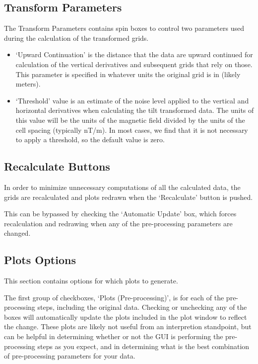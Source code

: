 \documentclass[letterpaper,10pt,english,openany,oneside]{sphinxmanual}
\begin{document}
\subsection{Transform Parameters}
\label{\detokenize{content/getting_started/GUI_overview:transform-parameters}}\label{\detokenize{content/getting_started/GUI_overview:id2}}
The Transform Parameters contains spin boxes to control two parameters used during the calculation of the transformed grids.
\begin{itemize}
\item {} 
‘Upward Continuation’ is the distance that the data are upward continued for calculation of the vertical derivatives and subsequent grids that rely on those. This parameter is specified in whatever units the original grid is in (likely meters).

\item {} 
‘Threshold’ value is an estimate of the noise level applied to the vertical and horizontal derivatives when calculating the tilt transformed data. The units of this value will be the units of the magnetic field divided by the units of the cell spacing (typically nT/m). In most cases, we find that it is not necessary to apply a threshold, so the default value is zero.

\end{itemize}


\subsection{Recalculate Buttons}
\label{\detokenize{content/getting_started/GUI_overview:recalculate-buttons}}\label{\detokenize{content/getting_started/GUI_overview:id3}}
In order to minimize unnecessary computations of all the calculated data, the grids are recalculated and plots redrawn when the ‘Recalculate’ button is pushed.

This can be bypassed by checking the ‘Automatic Update’ box, which forces recalculation and redrawing when any of the pre-processing parameters are changed.


\subsection{Plots Options}
\label{\detokenize{content/getting_started/GUI_overview:plots-options}}\label{\detokenize{content/getting_started/GUI_overview:id4}}
This section contains options for which plots to generate.

The first group of checkboxes, ‘Plots (Pre-processing)’, is for each of the pre-processing steps, including the original data. Checking or unchecking any of the boxes will automatically update the plots included in the plot window to reflect the change.
These plots are likely not useful from an interpretion standpoint, but can be helpful in determining whether or not the GUI is performing the pre-processing steps as you expect, and in determining what is the best combination of pre-processing parameters for your data.
\end{document}
